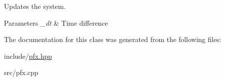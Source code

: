 Updates the system. 


\begin{DoxyParams}{Parameters}
{\em \-\_\-dt} & Time difference \\
\hline
\end{DoxyParams}


The documentation for this class was generated from the following files\-:\begin{DoxyCompactItemize}
\item 
include/\hyperlink{pfx_8hpp}{pfx.\-hpp}\item 
src/pfx.\-cpp\end{DoxyCompactItemize}
